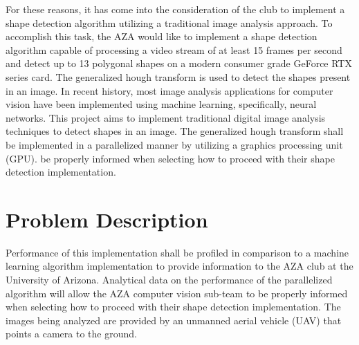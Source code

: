 \documentclass[conference]{IEEEtran}
\begin{document}
For these reasons, it has come into the consideration of the club to implement a shape detection algorithm utilizing a traditional image analysis approach.
To accomplish this task, the AZA would like to implement a shape detection algorithm capable of processing a video stream of at least 15 frames per second and detect up to 13 polygonal shapes on a modern consumer grade GeForce RTX series card.
The generalized hough transform\cite{BALLARD1981111} is used to detect the shapes present in an image.
In recent history, most image analysis applications for computer vision have been implemented using machine learning, specifically, neural networks. 
This project aims to implement traditional digital image analysis techniques to detect shapes in an image.
The generalized hough transform shall be implemented in a parallelized manner by utilizing a graphics processing unit (GPU).
be properly informed when selecting how to proceed with their shape detection implementation. 
\section{Problem Description} 
Performance of this implementation shall be profiled in comparison to a machine learning algorithm implementation to provide information to the AZA club at the University of Arizona.
Analytical data on the performance of the parallelized algorithm will allow the AZA computer vision sub-team to be properly informed when selecting how to proceed with their shape detection implementation. 
The images being analyzed are provided by an unmanned aerial vehicle (UAV) that points a camera to the ground.

\end{document}
